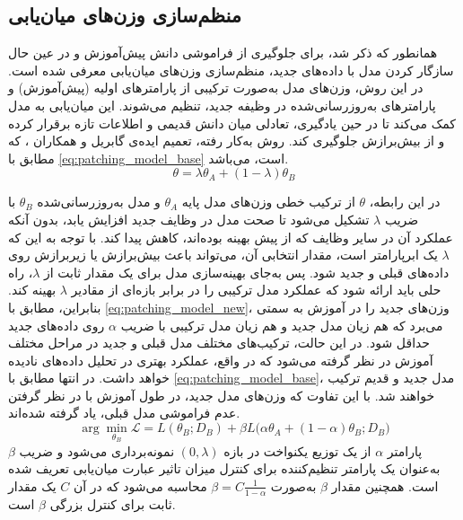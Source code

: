 \subsection{منظم‌سازی وزن‌های میان‌یابی}
همانطور که ذکر شد، برای جلوگیری از فراموشی دانش پیش‌آموزش و در عین حال سازگار کردن مدل با داده‌های جدید، منظم‌سازی وزن‌های میان‌یابی
 معرفی شده است. در این روش، وزن‌های مدل به‌صورت ترکیبی از پارامتر‌های اولیه (پیش‌آموزش) و پارامتر‌های به‌روزرسانی‌شده در وظیفه جدید، تنظیم می‌شوند. این میان‌یابی به مدل کمک می‌کند تا در حین یادگیری، تعادلی میان دانش قدیمی و اطلاعات تازه برقرار کرده و از بیش‌برازش
  جلوگیری کند. روش به‌کار رفته، تعمیم ایده‌ی گابریل و همکاران
  \cite{patchingmodels}،
 که مطابق با \eqref{eq:patching_model_base} است، می‌باشد.
\begin{equation}\label{eq:patching_model_base}
\theta = \lambda \theta_A + (1 - \lambda) \theta_B
\end{equation}

در این رابطه، $\theta$ از ترکیب خطی وزن‌های مدل پایه $\theta_A$ و مدل به‌روزرسانی‌شده $\theta_B$ با ضریب $\lambda$ تشکیل می‌شود تا صحت مدل در وظایف جدید افزایش یابد، بدون آنکه عملکرد آن در سایر وظایف که از پیش بهینه بوده‌اند، کاهش پیدا کند. با توجه به این که $\lambda$ یک ابرپارامتر  است، مقدار انتخابی آن، می‌تواند باعث بیش‌برازش یا زیربرازش روی داده‌های قبلی و جدید شود. پس به‌جای بهینه‌سازی مدل برای یک مقدار ثابت از $\lambda$، راه حلی باید ارائه شود که عملکرد مدل ترکیبی را در برابر بازه‌ای از مقادیر $\lambda$ بهینه کند. بنابراین، مطابق با \eqref{eq:patching_model_new}، وزن‌های جدید را در آموزش به سمتی می‌برد که هم زیان مدل جدید و هم زیان مدل ترکیبی با ضریب $\alpha$ روی داده‌های جدید حداقل شود. در این حالت، ترکیب‌های مختلف مدل قبلی و جدید در مراحل مختلف آموزش در نظر گرفته می‌شود که در واقع، عملکرد بهتری در تحلیل داده‌های نادیده خواهد داشت. در انتها مطابق با \eqref{eq:patching_model_base}، مدل جدید و قدیم ترکیب خواهند شد. با این تفاوت که وزن‌های مدل جدید، در طول آموزش با در نظر گرفتن عدم فراموشی مدل قبلی، یاد گرفته شده‌اند.
\begin{equation}\label{eq:patching_model_new}
	\arg \min_{\theta_B} \mathcal{L} =
	L(\theta_B; D_B) + \beta L\big(\alpha \theta_A + (1 - \alpha)\theta_B; D_B\big)
\end{equation}
پارامتر \( \alpha \) از یک توزیع یکنواخت در بازه \( (0, \lambda) \) نمونه‌برداری می‌شود و ضریب \( \beta \) به‌عنوان یک پارامتر تنظیم‌کننده برای کنترل میزان تاثیر عبارت میان‌یابی تعریف شده است. همچنین مقدار \( \beta \) به‌صورت \( \beta = C \frac{1}{1 - \alpha} \) محاسبه می‌شود که در آن \( C \) یک مقدار ثابت برای کنترل بزرگی \(\beta\) است. 

